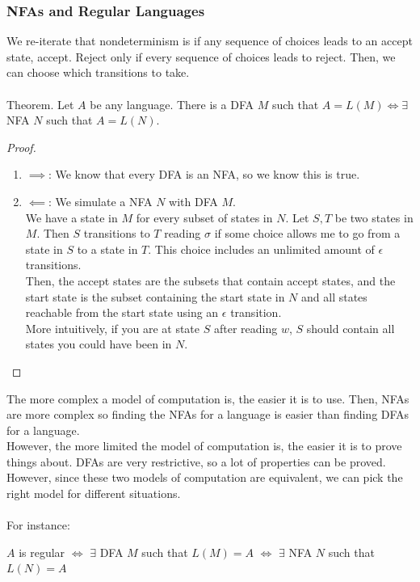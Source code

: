 \documentclass{article}
\begin{document}
    \subsubsection{NFAs and Regular Languages}
    We re-iterate that nondeterminism is if any sequence of choices leads to an accept state, accept. Reject only if every sequence of choices leads to reject. Then, we can choose which transitions to take.\\
    \\
    Theorem. Let $A$ be any language. There is a DFA $M$ such that $A = L(M) \iff \exists$ NFA $N$ such that $A = L(N)$.
    \begin{proof}
        \begin{enumerate}
            \item $\implies$: We know that every DFA is an NFA, so we know this is true. 
            
            \item $\impliedby$: We simulate a NFA $N$ with DFA $M$.\\
            We have a state in $M$ for every subset of states in $N$. Let $S, T$ be two states in $M$. Then $S$ transitions to $T$ reading $\sigma$ if some choice allows me to go from a state in $S$ to a state in $T$. This choice includes an unlimited amount of $\epsilon$ transitions.\\
            Then, the accept states are the subsets that contain accept states, and the start state is the subset containing the start state in $N$ and all states reachable from the start state using an $\epsilon$ transition.\\
            More intuitively, if you are at state $S$ after reading $w$, $S$ should contain all states you could have been in $N$.
        \end{enumerate}
    \end{proof}
    
    The more complex a model of computation is, the easier it is to use. Then, NFAs are more complex so finding the NFAs for a language is easier than finding DFAs for a language.\\
    However, the more limited the model of computation is, the easier it is to prove things about. DFAs are very restrictive, so a lot of properties can be proved.\\
    However, since these two models of computation are equivalent, we can pick the right model for different situations.\\
    \\
    For instance:
    \begin{center}
        $A$ is regular $\iff$ $\exists$ DFA $M$ such that $L(M) = A$ $\iff$ $\exists$ NFA $N$ such that $L(N) = A$
    \end{center}
    
\end{document}
